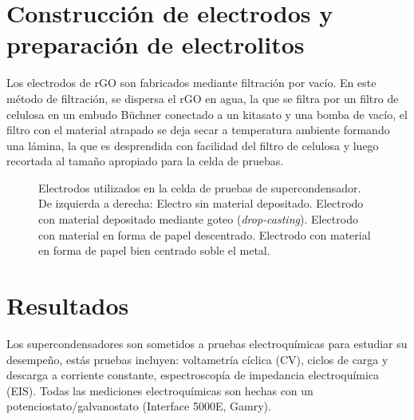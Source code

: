 \section{Construcción de electrodos y preparación de electrolitos}
Los electrodos de rGO son fabricados mediante filtración por vacío. En este método de filtración, se dispersa el rGO en agua, la que se filtra por un filtro de celulosa en un embudo Büchner conectado a un kitasato y una bomba de vacío, el filtro con el material atrapado se deja secar a temperatura ambiente formando una lámina, la que es desprendida con facilidad del filtro de celulosa y luego recortada al tamaño apropiado para la celda de pruebas.

\begin{figure}
	\centering
	\caption[Electrodos utilizados en la celda de pruebas de supercondensador.]{Electrodos utilizados en la celda de pruebas de supercondensador. De izquierda a derecha: Electro sin material depositado. Electrodo con material depositado mediante goteo (\emph{drop-casting}). Electrodo con material en forma de papel descentrado. Electrodo con material en forma de papel bien centrado soble el metal.}
	\label{fig:electrodes}
\end{figure}

\section{Resultados}
Los supercondensadores son sometidos a pruebas electroquímicas para estudiar su desempeño, estás pruebas incluyen: voltametría cíclica (CV), ciclos de carga y descarga a corriente constante, espectroscopía de impedancia electroquímica (EIS). Todas las mediciones electroquímicas son hechas con un potenciostato/galvanostato (Interface 5000E, Gamry).





%






